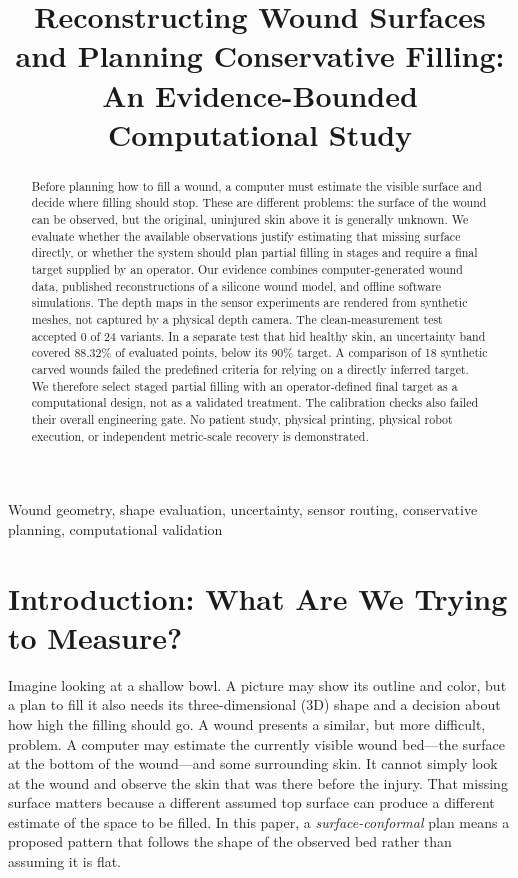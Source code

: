 \documentclass[conference]{IEEEtran}
\begin{document}
\title{Reconstructing Wound Surfaces and Planning Conservative Filling: An Evidence-Bounded Computational Study}

\author{
}

\maketitle

\begin{abstract}
Before planning how to fill a wound, a computer must estimate the visible
surface and decide where filling should stop. These are different problems:
the surface of the wound can be observed, but the original, uninjured skin
above it is generally unknown. We evaluate whether the available observations
justify estimating that missing surface directly, or whether the system should
plan partial filling in stages and require a final target supplied by an
operator. Our evidence combines computer-generated wound data, published
reconstructions of a silicone wound model, and offline software simulations.
The depth maps in the sensor experiments are rendered from synthetic meshes,
not captured by a physical depth camera. The clean-measurement test accepted
0 of 24 variants. In a separate test that hid healthy skin, an uncertainty
band covered 88.32\% of evaluated points, below its 90\% target. A comparison
of 18 synthetic carved wounds failed the predefined criteria for relying on a
directly inferred target. We therefore select staged partial filling with an
operator-defined final target as a computational design, not as a validated
treatment. The calibration checks also failed their overall engineering gate.
No patient study, physical printing, physical robot execution, or independent
metric-scale recovery is demonstrated.
\end{abstract}

\begin{IEEEkeywords}
Wound geometry, shape evaluation, uncertainty, sensor routing, conservative
planning, computational validation
\end{IEEEkeywords}

\section{Introduction: What Are We Trying to Measure?}

Imagine looking at a shallow bowl. A picture may show its outline and color,
but a plan to fill it also needs its three-dimensional (3D) shape and a
decision about how high the filling should go. A wound presents a similar,
but more difficult, problem. A computer may estimate the currently visible
wound bed---the surface at the bottom of the wound---and some surrounding
skin. It cannot simply look at the wound and observe the skin that was there
before the injury. That missing surface matters because a different assumed
top surface can produce a different estimate of the space to be filled.
In this paper, a \emph{surface-conformal} plan means a proposed pattern that
follows the shape of the observed bed rather than assuming it is flat.
\end{document}
